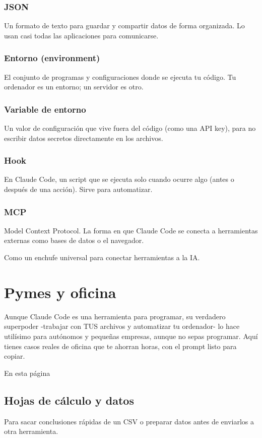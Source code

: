 \documentclass[11pt,a4paper]{book}
\begin{document}
\subsection{JSON}
Un formato de texto para guardar y compartir datos de forma organizada. Lo usan casi todas las aplicaciones para comunicarse.

\subsection{Entorno (environment)}
El conjunto de programas y configuraciones donde se ejecuta tu código. Tu ordenador es un entorno; un servidor es otro.

\subsection{Variable de entorno}
Un valor de configuración que vive fuera del código (como una API key), para no escribir datos secretos directamente en los archivos.

\subsection{Hook}
En Claude Code, un script que se ejecuta solo cuando ocurre algo (antes o después de una acción). Sirve para automatizar.

\subsection{MCP}
Model Context Protocol. La forma en que Claude Code se conecta a herramientas externas como bases de datos o el navegador.

Como un enchufe universal para conectar herramientas a la IA.

\chapter{Pymes y oficina}
Aunque Claude Code es una herramienta para programar, su verdadero superpoder -trabajar con TUS archivos y automatizar tu ordenador- lo hace utilísimo para autónomos y pequeñas empresas, aunque no sepas programar. Aquí tienes casos reales de oficina que te ahorran horas, con el prompt listo para copiar.

En esta página

\section{Hojas de cálculo y datos}
Para sacar conclusiones rápidas de un CSV o preparar datos antes de enviarlos a otra herramienta.
\end{document}
